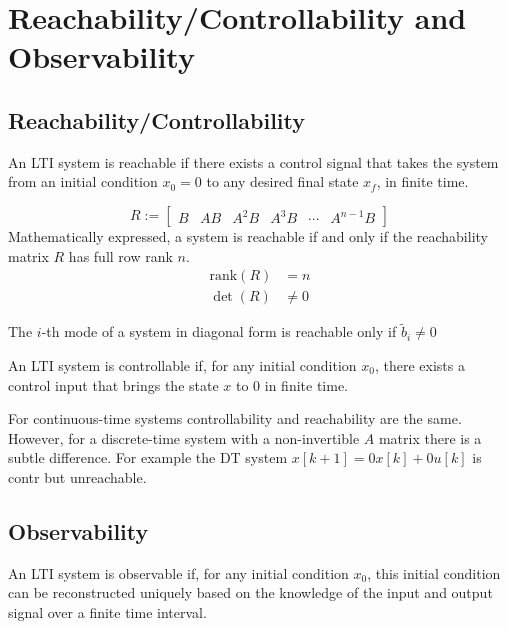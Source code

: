 \section{Reachability/Controllability and Observability}

\subsection{Reachability/Controllability}

An LTI system is reachable if there exists a control signal that takes the system from an initial condition $x_0 = 0$ to any desired final state $x_f$, in finite time.

\begin{equation*}
    R:= \begin{bmatrix}
        B & AB & A^2B & A^3B & \cdots & A^{n-1}B
    \end{bmatrix}
\end{equation*}
Mathematically expressed, a system is reachable if and only if the reachability matrix $R$ has full row rank $n$.
\begin{align*}
    \text{rank}(R) & = n    \\
    \det(R)        & \neq 0
\end{align*}


The $i$-th mode of a system in diagonal form is reachable only if $\tilde{b}_i \neq 0$


An LTI system is controllable if, for any initial condition $x_0$, there exists a control input that brings the state $x$ to $0$ in finite time.

For continuous-time systems controllability and reachability are the same. However, for a discrete-time system with a non-invertible $A$ matrix there is a subtle difference. For example the DT system $x[k+1] = 0x[k] + 0u[k]$ is contr but unreachable.

\subsection{Observability}

An LTI system is observable if, for any initial condition $x_0$, this initial condition can be reconstructed uniquely based on the knowledge of the input and output signal over a finite time interval.


